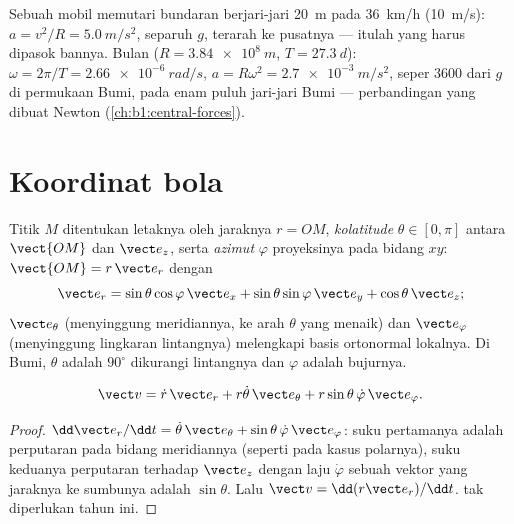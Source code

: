 \begin{example}\label{ex:b1:point-kinematics:circles}
Sebuah mobil memutari bundaran berjari-jari \qty{20}{m} pada
\qty{36}{km/h} (\qty{10}{m/s}): $a = v^2/R = \qty{5.0}{m/s^2}$, separuh
$g$, terarah ke pusatnya --- itulah yang harus dipasok bannya. Bulan
($R = \qty{3.84e8}{m}$, $T = \qty{27.3}{d}$): $\omega = 2\pi/T =
\qty{2.66e-6}{rad/s}$, $a = R\omega^2 = \qty{2.7e-3}{m/s^2}$, seper
$3600$ dari $g$ di permukaan Bumi, pada enam puluh jari-jari Bumi ---
perbandingan yang dibuat Newton (\cref{ch:b1:central-forces}).
\end{example}

\section{Koordinat bola}

\begin{definition}\label{def:b1:point-kinematics:spherical}
Titik $M$ ditentukan letaknya oleh jaraknya $r = OM$, \emph{kolatitude}
$\theta \in [0, \pi]$ antara $\vect{OM}$ dan $\vect e_z$, serta
\emph{azimut} $\varphi$ proyeksinya pada bidang $xy$:
$\vect{OM} = r\,\vect e_r$ dengan
\[
\vect e_r = \sin\theta\cos\varphi\,\vect e_x + \sin\theta\sin\varphi\,\vect e_y + \cos\theta\,\vect e_z ;
\]
$\vect e_\theta$ (menyinggung meridiannya, ke arah $\theta$ yang menaik)
dan $\vect e_\varphi$ (menyinggung lingkaran lintangnya) melengkapi
basis ortonormal lokalnya. Di Bumi, $\theta$ adalah $90^\circ$ dikurangi
lintangnya dan $\varphi$ adalah bujurnya.
\end{definition}

\begin{proposition}\label{prop:b1:point-kinematics:sphericalv}
\[
\vect v = \dot r\,\vect e_r + r\dot\theta\,\vect e_\theta + r\sin\theta\,\dot\varphi\,\vect e_\varphi .
\]
\end{proposition}

\begin{proof}
$\dd\vect e_r/\dd t = \dot\theta\,\vect e_\theta + \sin\theta\,\dot\varphi\,
\vect e_\varphi$: suku pertamanya adalah perputaran pada bidang
meridiannya (seperti pada kasus polarnya), suku keduanya perputaran
terhadap $\vect e_z$ dengan laju $\dot\varphi$ sebuah vektor yang
jaraknya ke sumbunya adalah $\sin\theta$. Lalu
$\vect v = \dd(r\vect e_r)/\dd t$.  tak diperlukan tahun ini.
\end{proof}

